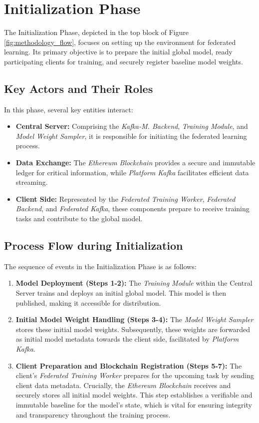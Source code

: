 \section{Initialization Phase}
\label{sec:initialization_phase}

The Initialization Phase, depicted in the top block of Figure \ref{fig:methodology_flow}, focuses on setting up the environment for federated learning. Its primary objective is to prepare the initial global model, ready participating clients for training, and securely register baseline model weights.

\subsection{Key Actors and Their Roles}
\label{ssec:init_actors}
In this phase, several key entities interact:
\begin{itemize}
    \item \textbf{Central Server:} Comprising the \textit{Kafka-M. Backend}, \textit{Training Module}, and \textit{Model Weight Sampler}, it is responsible for initiating the federated learning process.
    \item \textbf{Data Exchange:} The \textit{Ethereum Blockchain} provides a secure and immutable ledger for critical information, while \textit{Platform Kafka} facilitates efficient data streaming.
    \item \textbf{Client Side:} Represented by the \textit{Federated Training Worker}, \textit{Federated Backend}, and \textit{Federated Kafka}, these components prepare to receive training tasks and contribute to the global model.
\end{itemize}

\subsection{Process Flow during Initialization}
\label{ssec:init_process}
The sequence of events in the Initialization Phase is as follows:
\begin{enumerate}
    \item \textbf{Model Deployment (Steps 1-2):} The \textit{Training Module} within the Central Server trains and deploys an initial global model. This model is then published, making it accessible for distribution.
    \item \textbf{Initial Model Weight Handling (Steps 3-4):} The \textit{Model Weight Sampler} stores these initial model weights. Subsequently, these weights are forwarded as initial model metadata towards the client side, facilitated by \textit{Platform Kafka}.
    \item \textbf{Client Preparation and Blockchain Registration (Steps 5-7):} The client's \textit{Federated Training Worker} prepares for the upcoming task by sending client data metadata. Crucially, the \textit{Ethereum Blockchain} receives and securely stores all initial model weights. This step establishes a verifiable and immutable baseline for the model's state, which is vital for ensuring integrity and transparency throughout the training process.
\end{enumerate}

